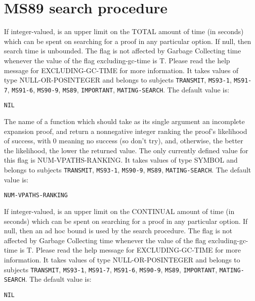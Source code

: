 \section{MS89 search procedure}

\begin{description} 
\item[MAX-SEARCH-LIMIT]  
If integer-valued, is an upper limit on the TOTAL amount of time
(in seconds) which can be spent on searching for a proof in any particular 
option.  If null, then search time is unbounded. The flag is not affected 
by Garbage Collecting time whenever the value of the flag excluding-gc-time 
is T. Please read the help message for EXCLUDING-GC-TIME for more information.
It takes values of type NULL-OR-POSINTEGER and belongs to subjects \texttt{TRANSMIT}, \texttt{MS93-1}, \texttt{MS91-7}, \texttt{MS91-6}, \texttt{MS90-9}, \texttt{MS89}, \texttt{IMPORTANT}, \texttt{MATING-SEARCH}.  The default value is: \begin{lstlisting}
NIL
\end{lstlisting}

\item[RANK-EPROOF-FN]  
The name of a function which should take as its single
argument an incomplete expansion proof, and return a nonnegative
integer ranking the proof's likelihood of success, with 0 meaning no
success (so don't try), and, otherwise, the better the likelihood, the
lower the returned value.
The only currently defined value for this flag is NUM-VPATHS-RANKING.
It takes values of type SYMBOL and belongs to subjects \texttt{TRANSMIT}, \texttt{MS93-1}, \texttt{MS90-9}, \texttt{MS89}, \texttt{MATING-SEARCH}.  The default value is: \begin{lstlisting}
NUM-VPATHS-RANKING
\end{lstlisting}

\item[SEARCH-TIME-LIMIT]  
If integer-valued, is an upper limit on the CONTINUAL amount of time
(in seconds) which can be spent on searching for a proof in any particular 
option.  If null, then an ad hoc bound is used by the search procedure.
The flag is not affected by Garbage Collecting time whenever the value of the 
flag excluding-gc-time is T. Please read the help message for EXCLUDING-GC-TIME
for more information.
It takes values of type NULL-OR-POSINTEGER and belongs to subjects \texttt{TRANSMIT}, \texttt{MS93-1}, \texttt{MS91-7}, \texttt{MS91-6}, \texttt{MS90-9}, \texttt{MS89}, \texttt{IMPORTANT}, \texttt{MATING-SEARCH}.  The default value is: \begin{lstlisting}
NIL
\end{lstlisting}

\item
\end{description}

